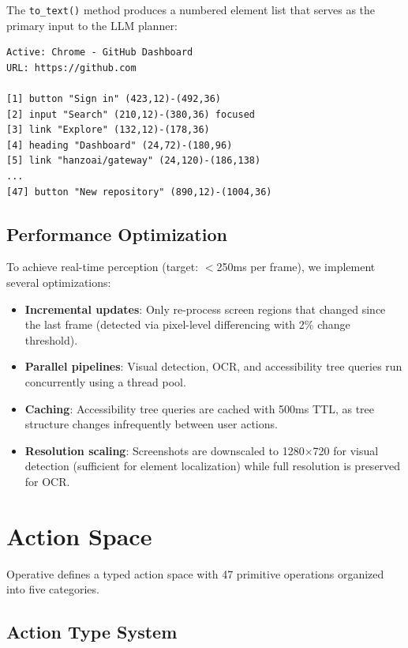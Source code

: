 \documentclass[11pt,twocolumn]{article}
\begin{document}
The \texttt{to\_text()} method produces a numbered element list that serves as the primary input to the LLM planner:

\begin{lstlisting}[caption=Example ScreenState text representation]
Active: Chrome - GitHub Dashboard
URL: https://github.com

[1] button "Sign in" (423,12)-(492,36)
[2] input "Search" (210,12)-(380,36) focused
[3] link "Explore" (132,12)-(178,36)
[4] heading "Dashboard" (24,72)-(180,96)
[5] link "hanzoai/gateway" (24,120)-(186,138)
...
[47] button "New repository" (890,12)-(1004,36)
\end{lstlisting}

\subsection{Performance Optimization}

To achieve real-time perception (target: $<$250ms per frame), we implement several optimizations:

\begin{itemize}[leftmargin=*]
    \item \textbf{Incremental updates}: Only re-process screen regions that changed since the last frame (detected via pixel-level differencing with 2\% change threshold).
    \item \textbf{Parallel pipelines}: Visual detection, OCR, and accessibility tree queries run concurrently using a thread pool.
    \item \textbf{Caching}: Accessibility tree queries are cached with 500ms TTL, as tree structure changes infrequently between user actions.
    \item \textbf{Resolution scaling}: Screenshots are downscaled to 1280$\times$720 for visual detection (sufficient for element localization) while full resolution is preserved for OCR.
\end{itemize}

\section{Action Space}
\label{sec:actions}

Operative defines a typed action space with 47 primitive operations organized into five categories.

\subsection{Action Type System}
\end{document}
